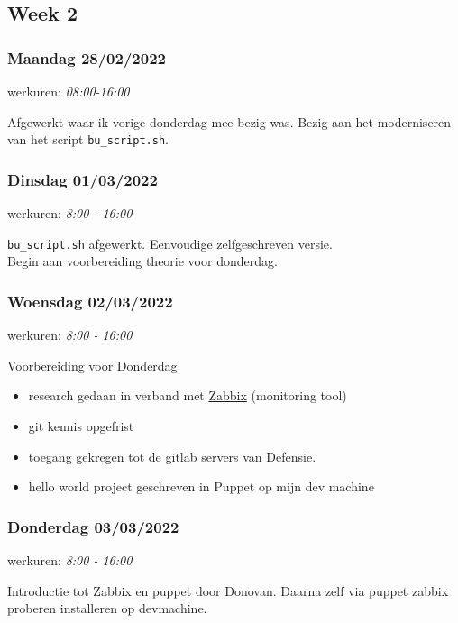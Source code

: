 \subsection{Week 2}

\subsubsection{Maandag 28/02/2022}

werkuren: \emph{08:00-16:00}

Afgewerkt waar ik vorige donderdag mee bezig was. Bezig aan het
moderniseren van het script \texttt{bu\_script.sh}.

\subsubsection{Dinsdag 01/03/2022}

werkuren: \emph{8:00 - 16:00}

\texttt{bu\_script.sh} afgewerkt. Eenvoudige zelfgeschreven versie.\\
Begin aan voorbereiding theorie voor donderdag.

\subsubsection{Woensdag 02/03/2022}

werkuren: \emph{8:00 - 16:00}

Voorbereiding voor Donderdag

\begin{itemize}
    \item research gedaan in verband met \href{https://www.zabbix.com/documentation/5.0/en/manual/introduction/about}{Zabbix} (monitoring tool)
    \item git kennis opgefrist
    \item toegang gekregen tot de gitlab servers van Defensie.
    \item hello world project geschreven in Puppet op mijn dev machine
\end{itemize}

\subsubsection{Donderdag 03/03/2022}

werkuren: \emph{8:00 - 16:00}

Introductie tot Zabbix en puppet door Donovan. Daarna zelf via puppet
zabbix proberen installeren op devmachine.

